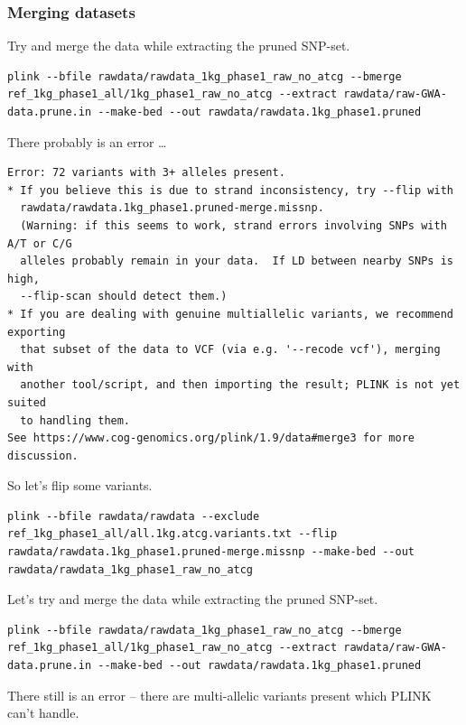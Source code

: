 \documentclass[
]{book}
\begin{document}
\hypertarget{merging-datasets-1}{%
\subsubsection{Merging datasets}\label{merging-datasets-1}}

Try and merge the data while extracting the pruned SNP-set.

\begin{lstlisting}
plink --bfile rawdata/rawdata_1kg_phase1_raw_no_atcg --bmerge ref_1kg_phase1_all/1kg_phase1_raw_no_atcg --extract rawdata/raw-GWA-data.prune.in --make-bed --out rawdata/rawdata.1kg_phase1.pruned
\end{lstlisting}

There probably is an error \ldots{}

\begin{lstlisting}
Error: 72 variants with 3+ alleles present.
* If you believe this is due to strand inconsistency, try --flip with
  rawdata/rawdata.1kg_phase1.pruned-merge.missnp.
  (Warning: if this seems to work, strand errors involving SNPs with A/T or C/G
  alleles probably remain in your data.  If LD between nearby SNPs is high,
  --flip-scan should detect them.)
* If you are dealing with genuine multiallelic variants, we recommend exporting
  that subset of the data to VCF (via e.g. '--recode vcf'), merging with
  another tool/script, and then importing the result; PLINK is not yet suited
  to handling them.
See https://www.cog-genomics.org/plink/1.9/data#merge3 for more discussion.
\end{lstlisting}

So let's flip some variants.

\begin{lstlisting}
plink --bfile rawdata/rawdata --exclude ref_1kg_phase1_all/all.1kg.atcg.variants.txt --flip rawdata/rawdata.1kg_phase1.pruned-merge.missnp --make-bed --out rawdata/rawdata_1kg_phase1_raw_no_atcg
\end{lstlisting}

Let's try and merge the data while extracting the pruned SNP-set.

\begin{lstlisting}
plink --bfile rawdata/rawdata_1kg_phase1_raw_no_atcg --bmerge ref_1kg_phase1_all/1kg_phase1_raw_no_atcg --extract rawdata/raw-GWA-data.prune.in --make-bed --out rawdata/rawdata.1kg_phase1.pruned
\end{lstlisting}

There still is an error -- there are multi-allelic variants present which PLINK can't handle.
\end{document}
